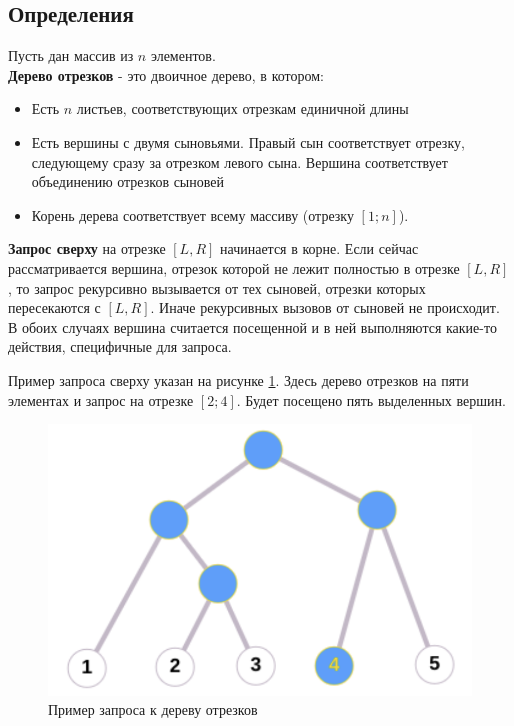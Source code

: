 \subsection{Определения}

Пусть дан массив из $n$ элементов. \\
\textbf{Дерево отрезков} - это двоичное дерево, в котором:

\begin{itemize}
    \item Есть $n$ листьев, соответствующих отрезкам единичной длины
    \item Есть вершины с двумя сыновьями. Правый сын соответствует отрезку,
    следующему сразу за отрезком левого сына. Вершина соответствует
    объединению отрезков сыновей
    \item Корень дерева соответствует всему массиву (отрезку $[1; n]$).
\end{itemize}

\textbf{Запрос сверху} на отрезке $[L, R]$ начинается в корне.
Если сейчас рассматривается вершина, отрезок которой не лежит полностью в
отрезке $[L, R]$, то запрос рекурсивно вызывается от тех сыновей, отрезки которых
пересекаются с $[L, R]$. Иначе рекурсивных вызовов от сыновей не происходит.
В обоих случаях вершина считается посещенной и в ней выполняются какие-то
действия, специфичные для запроса.

Пример запроса сверху указан на рисунке \ref{fig:segtree_example}. Здесь дерево отрезков на пяти элементах и запрос на отрезке $[2;4]$. Будет посещено пять выделенных вершин.

\begin{figure}[hbt!]
    \centering
    \includegraphics[scale=0.28]{images/segtree_example.png}
    \caption{Пример запроса к дереву отрезков}
    \label{fig:segtree_example}
\end{figure}

